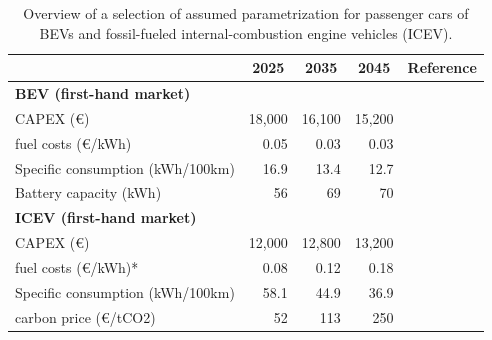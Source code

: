 \begin{table}[]
\centering
\caption{Overview of a selection of assumed parametrization for passenger cars of \acp{BEV} and fossil-fueled internal-combustion engine vehicles (ICEV).}
\label{tab:assumptions_cost}
\begin{tabular}{@{}lrrrl@{}}
 \toprule
                                         & \multicolumn{1}{c}{2025} & \multicolumn{1}{c}{2035} & \multicolumn{1}{c}{2045} & Reference \\ \midrule
\multicolumn{5}{l}{\textbf{\ac{BEV} (first-hand market)}}                                                                                  \\ \midrule
CAPEX (\euro)                                & 18,000                   & 16,100                   & 15,200                   &   \citep{GRUBE2021103110}        \\
fuel costs (\euro/kWh)                       & 0.05                     & 0.03                     & 0.03                     &    \citep{loffler2025european}       \\
Specific consumption (kWh/100km)         & 16.9                     & 13.4                     & 12.7                     &      \citep{GRUBE2021103110}     \\
Battery capacity (kWh)                   & 56                       & 69                       & 70                       &      \citep{GRUBE2021103110}     \\ \midrule
\multicolumn{5}{l}{\textbf{ICEV (first-hand market)}}                                                                                 \\ \midrule
CAPEX (\euro)                                & 12,000                   & 12,800                   & 13,200                   &   \citep{GRUBE2021103110}        \\
fuel costs (\euro/kWh)*                      & 0.08                     & 0.12                     & 0.18                     &      \citep{GRUBE2021103110}     \\
Specific consumption (kWh/100km)         & 58.1                     & 44.9                     & 36.9                     &      \citep{GRUBE2021103110}     \\
carbon price (\euro/tCO2) & 52                       & 113                      & 250                      &     \citep{loffler2017designing}      \\ \midrule

\end{tabular}
\end{table}
